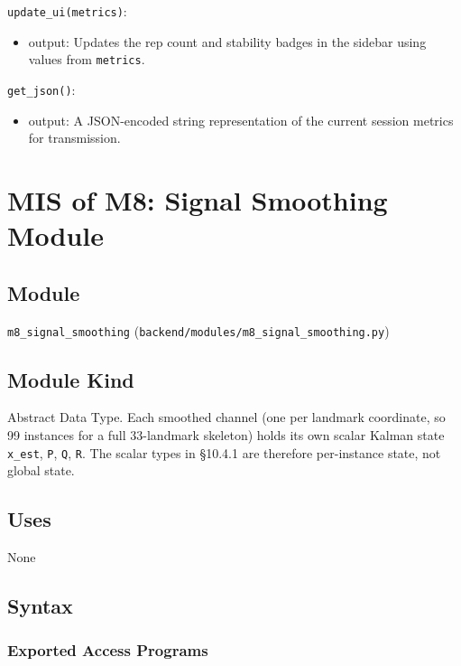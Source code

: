 \documentclass[12pt, titlepage]{article}
\begin{document}
\noindent \texttt{update\_ui(metrics)}:
\begin{itemize}
  \item output: Updates the rep count and stability badges in the sidebar using values from \texttt{metrics}.
\end{itemize}

\noindent \texttt{get\_json()}:
\begin{itemize}
  \item output: A JSON-encoded string representation of the current session metrics for transmission.
\end{itemize}

\newpage

\section{MIS of M8: Signal Smoothing Module} \label{M8}

\subsection{Module}
\texttt{m8\_signal\_smoothing} (\texttt{backend/modules/m8\_signal\_smoothing.py})

\subsection{Module Kind}
Abstract Data Type. Each smoothed channel (one per landmark
coordinate, so 99 instances for a full 33-landmark skeleton) holds
its own scalar Kalman state \texttt{x\_est}, \texttt{P}, \texttt{Q},
\texttt{R}. The scalar types in \S10.4.1 are therefore per-instance
state, not global state.

\subsection{Uses}
None

\subsection{Syntax}

\subsubsection{Exported Access Programs}
\end{document}
